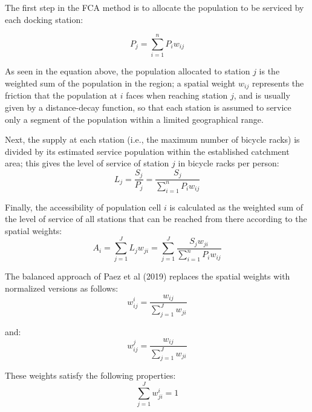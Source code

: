 \documentclass[]{elsarticle} %
\begin{document}
The first step in the FCA method is to allocate the population to be
serviced by each docking station:

\begin{equation}
\label{eq:population-allocation}
P_j = {\sum_{i = 1}^{n} P_i{w_{ij}}}
\end{equation}

As seen in the equation above, the population allocated to station \(j\)
is the weighted sum of the population in the region; a spatial weight
\(w_{ij}\) represents the friction that the population at \(i\) faces
when reaching station \(j\), and is usually given by a distance-decay
function, so that each station is assumed to service only a segment of
the population within a limited geographical range.

Next, the supply at each station (i.e., the maximum number of bicycle
racks) is divided by its estimated service population within the
established catchment area; this gives the level of service of station
\(j\) in bicycle racks per person: \begin{equation}
\label{eq:level-of-service}
L_j = \frac {S_j}{P_j} = \frac {S_j}{{\sum_{i = 1}^{n} P_i{w_{ij}}}}
\end{equation}

Finally, the accessibility of population cell \(i\) is calculated as the
weighted sum of the level of service of all stations that can be reached
from there according to the spatial weights: \begin{equation}
\label{eq:FCA-accessibility}
A_i = {\sum_{j = 1}^{J} L_j{w_{ji}}} = {\sum_{j = 1}^{J} \frac {S_j{w_{ji}}}{\sum_{i = 1}^{n} P_i{w_{ij}}}}
\end{equation}

The balanced approach of Paez et al (2019) replaces the spatial weights
with normalized versions as follows: \begin{equation}
\label{eq:spatial-weights}
{w_{ij}^{i} = \frac {w_{ij}}{\sum_{j = 1}^{J} {w_{ji}}}}
\end{equation}

\noindent and: \begin{equation}
\label{eq:spatial-weights-2}
{w_{ij}^{j} = \frac {w_{ij}}{\sum_{j = 1}^{J} {w_{ji}}}}
\end{equation}

These weights satisfy the following properties: \begin{equation}
\label{eq:weights}
\sum_{j = 1}^{J} {w^i_{ji}} = 1
\end{equation}
\end{document}
